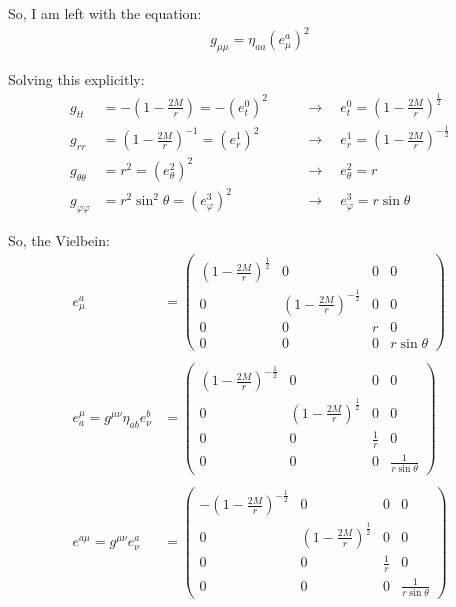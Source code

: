 \documentclass[12pt]{article}
\begin{document}
So, I am left with the equation:
\begin{align*}
  g_{\mu\mu} = \eta_{aa}(e^a_\mu)^2
\end{align*}

Solving this explicitly:
\begin{align*}
  g_{tt} &= -\left(1 - \frac{2M}{r}\right) = -(e^0_t)^2 \quad
  &&\rightarrow \quad e^0_t = \left(1 - \frac{2M}{r}\right)^\frac{1}{2} \\
  g_{rr} &= \left(1 - \frac{2M}{r}\right)^{-1} = (e^1_r)^2 \quad
  &&\rightarrow \quad e^1_r = \left(1 - \frac{2M}{r}\right)^{-\frac{1}{2}} \\
  g_{\theta\theta} &= r^2 = (e^2_\theta)^2 \quad
  &&\rightarrow \quad e^2_\theta = r \\
  g_{\varphi\varphi} &= r^2\sin^2{\theta} = (e^3_\varphi)^2 \quad
  &&\rightarrow \quad e^3_\varphi = r\sin{\theta}
\end{align*}

So, the Vielbein:
\begin{align*}
  e^a_\mu &= 
  \begin{pmatrix}
    \left(1 - \frac{2M}{r}\right)^\frac{1}{2} & 0 & 0 & 0 \\
    0 & \left(1 - \frac{2M}{r}\right)^{-\frac{1}{2}} & 0 & 0 \\
    0 & 0 & r & 0 \\
    0 & 0 & 0 & r\sin{\theta}
  \end{pmatrix} \\ \\
  e^\mu_a = g^{\mu\nu}\eta_{ab}e^b_\nu &=
  \begin{pmatrix}
    \left(1 - \frac{2M}{r}\right)^{-\frac{1}{2}} & 0 & 0 & 0 \\
    0 & \left(1 - \frac{2M}{r}\right)^\frac{1}{2} & 0 & 0 \\
    0 & 0 & \frac{1}{r} & 0 \\
    0 & 0 & 0 & \frac{1}{r\sin{\theta}}
  \end{pmatrix} \\ \\
  e^{a\mu} = g^{\mu\nu}e^a_\nu &=
  \begin{pmatrix}
    -\left(1 - \frac{2M}{r}\right)^{-\frac{1}{2}} & 0 & 0 & 0 \\
    0 & \left(1 - \frac{2M}{r}\right)^\frac{1}{2} & 0 & 0 \\
    0 & 0 & \frac{1}{r} & 0 \\
    0 & 0 & 0 & \frac{1}{r\sin{\theta}}
  \end{pmatrix}
\end{align*}
\end{document}

